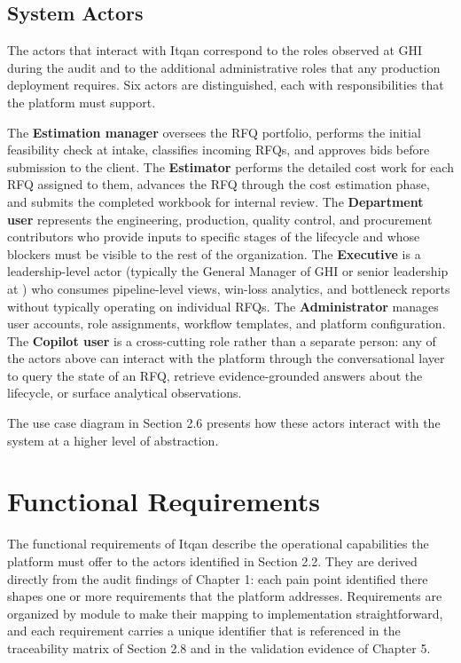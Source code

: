 \subsection*{System Actors}
The actors that interact with Itqan correspond to the roles observed at GHI during the audit and to the additional administrative roles that any production deployment requires. Six actors are distinguished, each with responsibilities that the platform must support.

The \textbf{Estimation manager} oversees the RFQ portfolio, performs the initial feasibility check at intake, classifies incoming RFQs, and approves bids before submission to the client. The \textbf{Estimator} performs the detailed cost work for each RFQ assigned to them, advances the RFQ through the cost estimation phase, and submits the completed workbook for internal review. The \textbf{Department user} represents the engineering, production, quality control, and procurement contributors who provide inputs to specific stages of the lifecycle and whose blockers must be visible to the rest of the organization. The \textbf{Executive} is a leadership-level actor (typically the General Manager of GHI or senior leadership at \clientCompany) who consumes pipeline-level views, win-loss analytics, and bottleneck reports without typically operating on individual RFQs. The \textbf{Administrator} manages user accounts, role assignments, workflow templates, and platform configuration. The \textbf{Copilot user} is a cross-cutting role rather than a separate person: any of the actors above can interact with the platform through the conversational layer to query the state of an RFQ, retrieve evidence-grounded answers about the lifecycle, or surface analytical observations.

The use case diagram in Section 2.6 presents how these actors interact with the system at a higher level of abstraction.

\section{Functional Requirements}
The functional requirements of Itqan describe the operational capabilities the platform must offer to the actors identified in Section 2.2. They are derived directly from the audit findings of Chapter 1: each pain point identified there shapes one or more requirements that the platform addresses. Requirements are organized by module to make their mapping to implementation straightforward, and each requirement carries a unique identifier that is referenced in the traceability matrix of Section 2.8 and in the validation evidence of Chapter 5.

